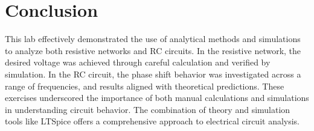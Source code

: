 \chapter{Conclusion}

This lab effectively demonstrated the use of analytical methods and simulations to analyze both resistive networks and RC circuits. In the resistive network, the desired voltage was achieved through careful calculation and verified by simulation. In the RC circuit, the phase shift behavior was investigated across a range of frequencies, and results aligned with theoretical predictions. These exercises underscored the importance of both manual calculations and simulations in understanding circuit behavior. The combination of theory and simulation tools like LTSpice offers a comprehensive approach to electrical circuit analysis.
